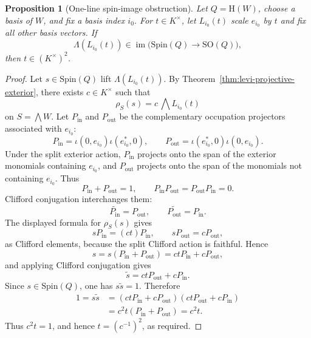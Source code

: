 \documentclass{birkjour}
\theoremstyle{plain}
\newtheorem{proposition}[theorem]{Proposition}
\theoremstyle{definition}
\theoremstyle{remark}
\numberwithin{equation}{section}
\newcommand{\Spin}{\mathrm{Spin}}
\newcommand{\SO}{\mathrm{SO}}
\newcommand{\Hyp}{\mathrm{H}}
\begin{document}
\begin{proposition}[One-line spin-image obstruction]
\label{prop:line-projector-converse}
Let \(Q=\Hyp(W)\), choose a basis of \(W\), and fix a basis index \(i_0\).
For \(t\in K^\times\), let \(L_{i_0}(t)\) scale \(e_{i_0}\) by \(t\) and fix all
other basis vectors. If
\[
  \Lambda(L_{i_0}(t))\in
  \operatorname{im}\bigl(\Spin(Q)\to\SO(Q)\bigr),
\]
then \(t\in(K^\times)^2\).
\end{proposition}

\begin{proof}
Let \(s\in\Spin(Q)\) lift \(\Lambda(L_{i_0}(t))\). By
Theorem~\ref{thm:levi-projective-exterior}, there exists \(c\in K^\times\) such
that
\[
  \rho_S(s)=c\,\bigwedge L_{i_0}(t)
\]
on \(S=\bigwedge W\). Let \(P_{\mathrm{in}}\) and \(P_{\mathrm{out}}\) be the
complementary occupation projectors associated with \(e_{i_0}\):
\[
  P_{\mathrm{in}}=\iota(0,e_{i_0})\iota(e_{i_0}^*,0),\qquad
  P_{\mathrm{out}}=\iota(e_{i_0}^*,0)\iota(0,e_{i_0}).
\]
Under the split exterior action, \(P_{\mathrm{in}}\) projects onto the span of
the exterior monomials containing \(e_{i_0}\), and \(P_{\mathrm{out}}\) projects
onto the span of the monomials not containing \(e_{i_0}\). Thus
\[
  P_{\mathrm{in}}+P_{\mathrm{out}}=1,\qquad
  P_{\mathrm{in}}P_{\mathrm{out}}=P_{\mathrm{out}}P_{\mathrm{in}}=0.
\]
Clifford conjugation interchanges them:
\[
  \widetilde{P_{\mathrm{in}}}=P_{\mathrm{out}},\qquad
  \widetilde{P_{\mathrm{out}}}=P_{\mathrm{in}}.
\]
The displayed formula for \(\rho_S(s)\) gives
\[
  sP_{\mathrm{in}}=(ct)P_{\mathrm{in}},
  \qquad
  sP_{\mathrm{out}}=cP_{\mathrm{out}},
\]
as Clifford elements, because the split Clifford action is faithful. Hence
\[
  s=s(P_{\mathrm{in}}+P_{\mathrm{out}})
   =ctP_{\mathrm{in}}+cP_{\mathrm{out}},
\]
and applying Clifford conjugation gives
\[
  \tilde{s}=ctP_{\mathrm{out}}+cP_{\mathrm{in}}.
\]
Since \(s\in\Spin(Q)\), one has \(s\tilde{s}=1\). Therefore
\[
\begin{aligned}
  1=s\tilde{s}
    &=(ctP_{\mathrm{in}}+cP_{\mathrm{out}})
      (ctP_{\mathrm{out}}+cP_{\mathrm{in}})\\
    &=c^2t(P_{\mathrm{in}}+P_{\mathrm{out}})
      =c^2t.
\end{aligned}
\]
Thus \(c^2t=1\), and hence \(t=(c^{-1})^2\), as required.
\end{proof}
\end{document}
